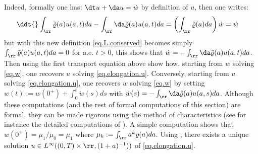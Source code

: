 \documentclass[]{jnsao}
\newcommand{\kernel}{\varrho}
\newcommand{\tkernel}{\tilde{\varrho}}
\begin{document}
Indeed, formally one has: $\dt u + \da u = \dot{w}$ by definition 
of $u$, then one writes:
\begin{align}
\ddt{} \int_\rr \tkernel(a) u(a,t) da &- \int_\rr \da \tkernel (a ) u(a,t) da = \left(\int_\rr \tkernel(a) da\right) \dot{w} = \dot{w}
\end{align}
but with this new definition \eqref{eq.L.conserved} becomes simply  
$\int_\rr \tkernel(a) u(a,t) da=0$ for a.e. $t>0$, this shows that 
$\dot{w} = - \int_\rr \da \tkernel(a) u(a,t) da$.  
Then using the first transport equation above show how, starting from $w$ solving \eqref{eq.w},
one recovers $u$ solving \eqref{eq.elongation.u}.
Conversely, starting from $u$ solving \eqref{eq.elongation.u}, one recovers $w$ solving \eqref{eq.w} by setting 
$w(t) := w(0^+) + \int_0^t \dot{w}(s) ds$ with $\dot{w}(s) = - \int_\rr \da \tkernel(a) u(a,s) da$. 
Although these computations (and the rest of formal computations of this section) 
are formal, they can be made rigorous using the 
method of characteristics (see for instance the detailed computations of \cite[Lemma 3.1]{MiOel.1}).
A simple computation shows that $w(0^+)= \mu_1/\mu_0 = \mu_1$ where 
$\mu_k := \int_\rr a^k \kernel(a) da$.
Using \cite[Theorem 6.1]{MiOel.2}, there exists a unique solution 
$u \in L^\infty((0,T)\times\rr,(1+a)^{-1}))$ of \eqref{eq.elongation.u}.
\end{document}
